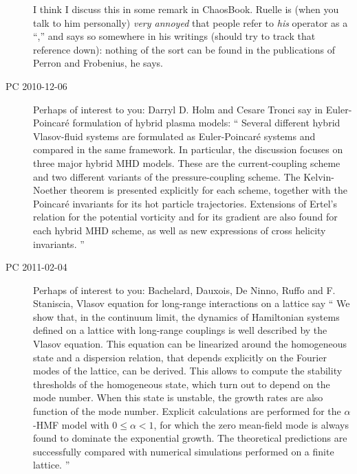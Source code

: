 \begin{description}
I think I discuss this in some remark in ChaosBook. Ruelle is (when you
talk to him personally) \emph{very annoyed} that people refer to \emph{his}
operator as a ``\FPoper,'' and says so somewhere in his writings (should try to
track that reference down): nothing
of the sort can be found in the publications of Perron and Frobenius,
he says.

\item[PC 2010-12-06] Perhaps of interest to you:
Darryl D. Holm and  Cesare Tronci say in
{Euler-Poincar\'e formulation of hybrid plasma models}:
``
 Several different hybrid Vlasov-fluid systems are formulated as
Euler-Poincar\'e systems and compared in the same framework. In particular, the
discussion focuses on three major hybrid MHD models. These are the
current-coupling scheme and two different variants of the pressure-coupling
scheme. The Kelvin-Noether theorem is presented explicitly for each scheme,
together with the Poincar\'e invariants for its hot particle trajectories.
Extensions of Ertel's relation for the potential vorticity and for its gradient
are also found for each hybrid MHD scheme, as well as new expressions of cross
helicity invariants.
''

\item[PC 2011-02-04] Perhaps of interest to you:
Bachelard, Dauxois, De Ninno, Ruffo and F. Staniscia,
{Vlasov equation for long-range interactions on a lattice} say
    ``
 We show that, in the continuum limit, the dynamics of Hamiltonian systems
defined on a lattice with long-range couplings is well described by the Vlasov
equation. This equation can be linearized around the homogeneous state and a
dispersion relation, that depends explicitly on the Fourier modes of the
lattice, can be derived. This allows to compute the stability thresholds of the
homogeneous state, which turn out to depend on the mode number. When this state
is unstable, the growth rates are also function of the mode number. Explicit
calculations are performed for the $\alpha$-HMF model with $0 \leq \alpha <1$,
for which the zero mean-field mode is always found to dominate the exponential
growth. The theoretical predictions are successfully compared with numerical
simulations performed on a finite lattice.
    ''
    
\end{description}
